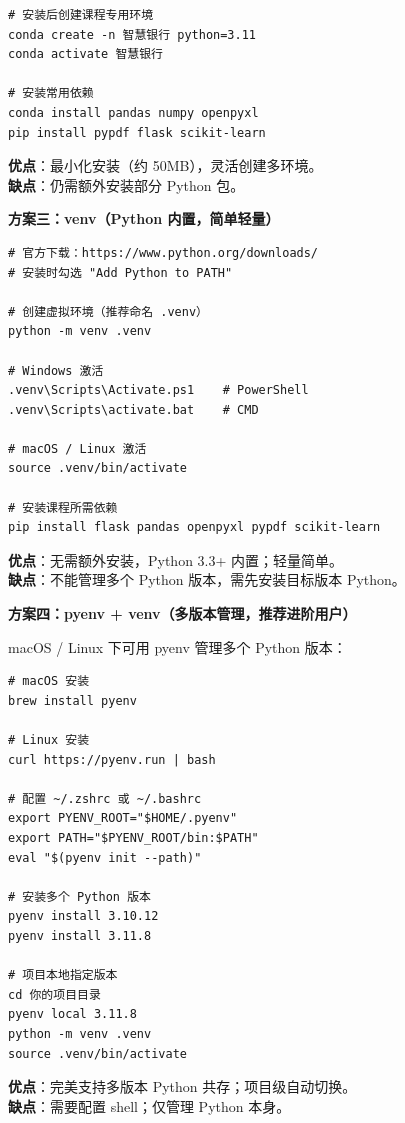 \documentclass[12pt,a4paper]{ctexart}
\begin{document}
\begin{lstlisting}[style=shell]
# 安装后创建课程专用环境
conda create -n 智慧银行 python=3.11
conda activate 智慧银行

# 安装常用依赖
conda install pandas numpy openpyxl
pip install pypdf flask scikit-learn
\end{lstlisting}

\textbf{优点}：最小化安装（约 50MB），灵活创建多环境。\\
\textbf{缺点}：仍需额外安装部分 Python 包。

\textbf{方案三：venv（Python 内置，简单轻量）}

\begin{lstlisting}[style=shell]
# 官方下载：https://www.python.org/downloads/
# 安装时勾选 "Add Python to PATH"

# 创建虚拟环境（推荐命名 .venv）
python -m venv .venv

# Windows 激活
.venv\Scripts\Activate.ps1    # PowerShell
.venv\Scripts\activate.bat    # CMD

# macOS / Linux 激活
source .venv/bin/activate

# 安装课程所需依赖
pip install flask pandas openpyxl pypdf scikit-learn
\end{lstlisting}

\textbf{优点}：无需额外安装，Python 3.3+ 内置；轻量简单。\\
\textbf{缺点}：不能管理多个 Python 版本，需先安装目标版本 Python。

\textbf{方案四：pyenv + venv（多版本管理，推荐进阶用户）}

macOS / Linux 下可用 pyenv 管理多个 Python 版本：

\begin{lstlisting}[style=shell]
# macOS 安装
brew install pyenv

# Linux 安装
curl https://pyenv.run | bash

# 配置 ~/.zshrc 或 ~/.bashrc
export PYENV_ROOT="$HOME/.pyenv"
export PATH="$PYENV_ROOT/bin:$PATH"
eval "$(pyenv init --path)"

# 安装多个 Python 版本
pyenv install 3.10.12
pyenv install 3.11.8

# 项目本地指定版本
cd 你的项目目录
pyenv local 3.11.8
python -m venv .venv
source .venv/bin/activate
\end{lstlisting}

\textbf{优点}：完美支持多版本 Python 共存；项目级自动切换。\\
\textbf{缺点}：需要配置 shell；仅管理 Python 本身。
\end{document}
